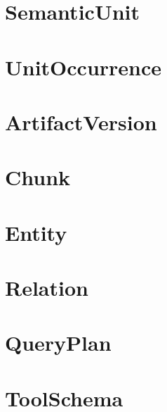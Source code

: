 \section{SemanticUnit}


\section{UnitOccurrence}


\section{ArtifactVersion}


\section{Chunk}


\section{Entity}


\section{Relation}


\section{QueryPlan}


\section{ToolSchema}


